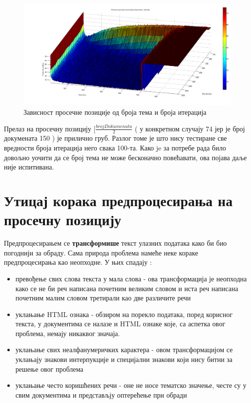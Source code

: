 		\begin{figure}[H]
    \centering
   \includegraphics[scale=0.3]{./Slike/cutoff.png} 
	\caption{Зависност просечне позиције од броја тема и броја итерација}
	\label{fig:slika1}
\end{figure}


Прелаз на просечну позицију $[\frac{brojDokumenata}{2}$ ( у конкретном случају 74 јер је број докумената 150 ) је прилично груб. Разлог томе је што нису тестиране све вредности броја итерација него свака 100-та. Како je за потребе рада било довољно  уочити да се број тема не може бесконачно повећавати, ова појава даље није испитивана.


\section{Утицај корака предпроцесирања на просечну позицију}

Предпроцесирањем се \textbf{трансформише} текст улазних података како би био погоднији за обраду. Сама природа проблема намеће неке кораке предпроцесирања као неопходне. У њих спадају :

\begin{itemize}
\item превођење свих слова текста у мала слова - ова трансформација је неопходна како се не би  реч написана почетним великим словом и иста реч написана почетним малим словом третирали као две различите речи
\item уклањање HTML ознака - обзиром на порекло података, поред корисног текста, у документима се налазе и HTML ознаке које, са аспетка овог проблема, немају никаквог значаја.
\item уклањање свих неалфанумеричких карактера - овом трансформацијом се уклањају знакови интерпукције и специјални знакови који нису битни за решење овог проблема
\item уклањање често коришћених речи - оне не носе тематско значење, честе су у свим документима и представљју оптерећење при обради
\end{itemize}

